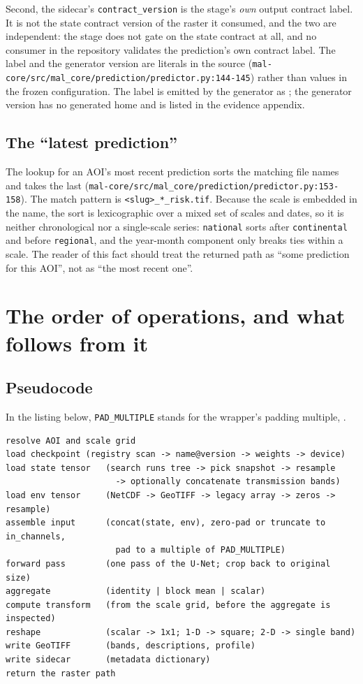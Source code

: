 \documentclass[11pt,a4paper]{article}
\newcommand{\code}[1]{\texttt{#1}}
\begin{document}
Second, the sidecar's \code{contract\_version} is the stage's \emph{own}
output contract label. It is not the state contract version
 of the raster it consumed, and the two are
independent: the stage does not gate on the state contract at all, and no
consumer in the repository validates the prediction's own contract label.
The label and the generator version are literals in the source
(\code{mal-core/src/mal\_core/prediction/predictor.py:144-145}) rather than
values in the frozen configuration. The label is emitted by the generator as
; the generator version has no
generated home and is listed in the evidence appendix.

\subsection{The ``latest prediction''}
\label{sec:latest}

The lookup for an AOI's most recent prediction sorts the matching file names
and takes the last
(\code{mal-core/src/mal\_core/prediction/predictor.py:153-158}). The match
pattern is \code{<slug>\_*\_risk.tif}. Because the scale is embedded in the
name, the sort is lexicographic over a mixed set of scales and dates, so it
is neither chronological nor a single-scale series: \code{national} sorts
after \code{continental} and before \code{regional}, and the year-month
component only breaks ties within a scale. The reader of this fact should
treat the returned path as ``some prediction for this AOI'', not as ``the
most recent one''.

\section{The order of operations, and what follows from it}

\subsection{Pseudocode}

In the listing below, \code{PAD\_MULTIPLE} stands for the wrapper's padding
multiple, .

\begin{verbatim}
resolve AOI and scale grid
load checkpoint (registry scan -> name@version -> weights -> device)
load state tensor   (search runs tree -> pick snapshot -> resample
                      -> optionally concatenate transmission bands)
load env tensor     (NetCDF -> GeoTIFF -> legacy array -> zeros -> resample)
assemble input      (concat(state, env), zero-pad or truncate to in_channels,
                      pad to a multiple of PAD_MULTIPLE)
forward pass        (one pass of the U-Net; crop back to original size)
aggregate           (identity | block mean | scalar)
compute transform   (from the scale grid, before the aggregate is inspected)
reshape             (scalar -> 1x1; 1-D -> square; 2-D -> single band)
write GeoTIFF       (bands, descriptions, profile)
write sidecar       (metadata dictionary)
return the raster path
\end{verbatim}
\end{document}
